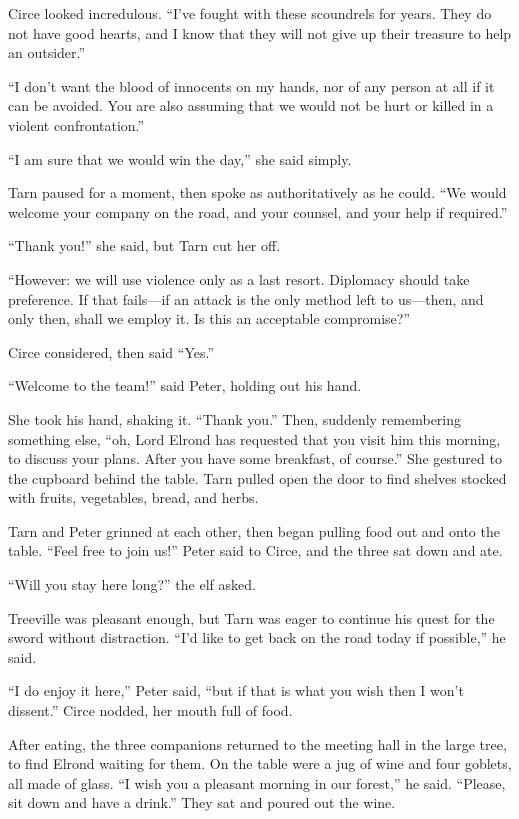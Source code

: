 Circe looked incredulous.  ``I've fought with these scoundrels for years.  They do not have good hearts, and I know that they will not give up their treasure to help an outsider.''

``I don't want the blood of innocents on my hands, nor of any person at all if it can be avoided.  You are also assuming that we would not be hurt or killed in a violent confrontation.''

``I am sure that we would win the day,'' she said simply.

Tarn paused for a moment, then spoke as authoritatively as he could.  ``We would welcome your company on the road, and your counsel, and your help if required.''

``Thank you!'' she said, but Tarn cut her off.

``However: we will use violence only as a last resort.  Diplomacy should take preference.  If that fails---if an attack is the only method left to us---then, and only then, shall we employ it.  Is this an acceptable compromise?''

Circe considered, then said ``Yes.''

``Welcome to the team!'' said Peter, holding out his hand.

She took his hand, shaking it.  ``Thank you.'' Then, suddenly remembering something else, ``oh, Lord Elrond has requested that you visit him this morning, to discuss your plans.  After you have some breakfast, of course.''  She gestured to the cupboard behind the table.  Tarn pulled open the door to find shelves stocked with fruits, vegetables, bread, and herbs.

Tarn and Peter grinned at each other, then began pulling food out and onto the table.  ``Feel free to join us!'' Peter said to Circe, and the three sat down and ate.

``Will you stay here long?'' the elf asked.

Treeville was pleasant enough, but Tarn was eager to continue his quest for the sword without distraction. ``I'd like to get back on the road today if possible,'' he said.

``I do enjoy it here,'' Peter said, ``but if that is what you wish then I won't dissent.''  Circe nodded, her mouth full of food.

After eating, the three companions returned to the meeting hall in the large tree, to find Elrond waiting for them.  On the table were a jug of wine and four goblets, all made of glass.  ``I wish you a pleasant morning in our forest,'' he said.  ``Please, sit down and have a drink.''  They sat and poured out the wine.

